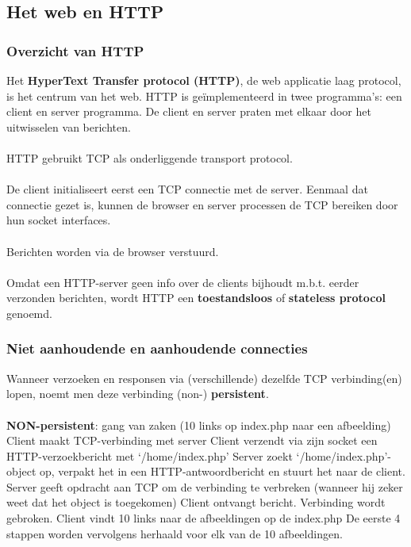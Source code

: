 \subsection{Het web en HTTP}

\subsubsection{Overzicht van HTTP}

Het \textbf{HyperText Transfer protocol (HTTP)}, de web applicatie laag protocol, is het centrum van het web. HTTP is geïmplementeerd in twee programma’s: een client en server programma. De client en server praten met elkaar door het uitwisselen van berichten.
\\\\
HTTP gebruikt TCP als onderliggende transport protocol. 
\\\\
De client initialiseert eerst een TCP connectie met de server. Eenmaal dat connectie gezet is, kunnen de browser en server processen de TCP bereiken door hun socket interfaces.
\\\\
Berichten worden via de browser verstuurd.
\\\\
Omdat een HTTP-server geen info over de clients bijhoudt m.b.t. eerder verzonden berichten, wordt HTTP een \textbf{toestandsloos} of \textbf{stateless protocol} genoemd.

\subsubsection{Niet aanhoudende en aanhoudende connecties}


Wanneer verzoeken en responsen via (verschillende) dezelfde TCP verbinding(en) lopen, noemt men deze verbinding (non-) \textbf{persistent}.\\\\
\textbf{NON-persistent}: gang van zaken (10 links op index.php naar een afbeelding)\\
\be
\itf Client maakt TCP-verbinding met server
\itf Client verzendt via zijn socket een HTTP-verzoekbericht met ‘/home/index.php’
\itf Server zoekt ‘/home/index.php’-object op, verpakt het in een HTTP-antwoordbericht en stuurt het naar de client.
\itf Server geeft opdracht aan TCP om de verbinding te verbreken (wanneer hij zeker weet dat het object is toegekomen)
\itf Client ontvangt bericht. Verbinding wordt gebroken. Client vindt 10 links naar de afbeeldingen op de index.php
\itf De eerste 4 stappen worden vervolgens herhaald voor elk van de 10 afbeeldingen.
\ee

